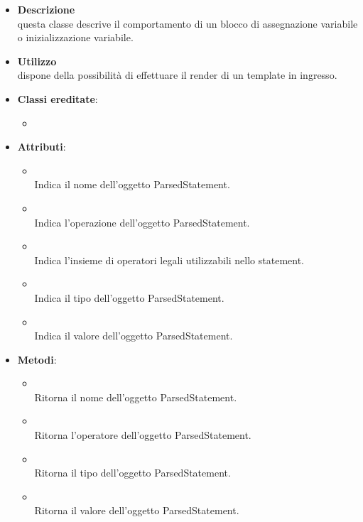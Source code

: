 \begin{itemize}
\item \textbf{Descrizione}\\
questa classe descrive il comportamento di un blocco di assegnazione variabile o inizializzazione variabile.	
\item \textbf{Utilizzo}\\
dispone della possibilità di effettuare il render di un template in ingresso.
\item \textbf{Classi ereditate}:
\begin{itemize}
\item \hyperref[\nogloxy{swedesigner::server::project::ParsedInstruction}]{}
\end{itemize}
\item \textbf{Attributi}:
\begin{itemize}
\item {}
\\ Indica il nome dell'oggetto ParsedStatement.
\item {}
\\ Indica l'operazione dell'oggetto ParsedStatement.
\item {}
\\ Indica l'insieme di operatori legali utilizzabili nello statement.
\item {}
\\ Indica il tipo dell'oggetto ParsedStatement.
\item {}
\\ Indica il valore dell'oggetto ParsedStatement.
\end{itemize}
\item \textbf{Metodi}:
\begin{itemize}
\item {}
\\ Ritorna il nome dell'oggetto ParsedStatement.
\item {}
\\ Ritorna l'operatore dell'oggetto ParsedStatement.
\item {}
\\ Ritorna il tipo dell'oggetto ParsedStatement.
\item {}
\\ Ritorna il valore dell'oggetto ParsedStatement.

\end{itemize}
\end{itemize}
